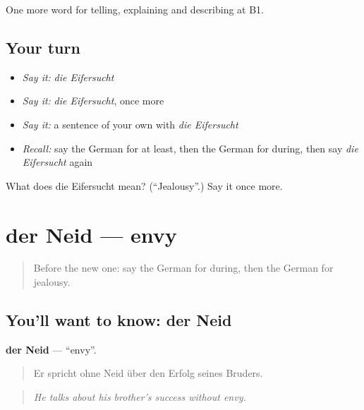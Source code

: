 \begin{grammarlens}[title={What you've built}]
One more word for telling, explaining and describing at B1.
\end{grammarlens}

\subsection*{Your turn}
\begin{itemize}
\raggedright
  \item \emph{Say it:} \emph{die Eifersucht}
  \item \emph{Say it:} \emph{die Eifersucht}, once more
  \item \emph{Say it:} a sentence of your own with \emph{die Eifersucht}
  \item \emph{Recall:} say the German for at least, then the German for during, then say \emph{die Eifersucht} again
\end{itemize}

\begin{tcolorbox}[breakable,colback=teal!4,colframe=teal!35!black,title={Before you move on}]
What does die Eifersucht mean? (\textquotedblleft{}Jealousy\textquotedblright{}.) Say it once more.
\end{tcolorbox}
\section[der Neid]{der Neid — envy}

\label{lesson:GE-C466-neid}



\begin{quote}
Before the new one: say the German for during, then the German for jealousy.
\end{quote}

\subsection*{You'll want to know: der Neid}
\textbf{der Neid} — \textquotedblleft{}envy\textquotedblright{}.

\begin{quote}
Er spricht ohne Neid über den Erfolg seines Bruders.
\end{quote}

\begin{quote}
\emph{He talks about his brother's success without envy.}
\end{quote}

